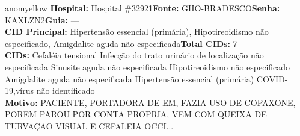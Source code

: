 \documentclass[a4paper,10pt]{article}
\begin{document}
\begin{anomalycard}[Interna\c{c}\~{a}o \#121087 | Pac. \#100353 | MODERADO (z=2.22) | LOS: 11d | 12/03/2026\,$\to$\,—]{anomyellow}
\textbf{Hospital:} Hospital \#32921\quad \textbf{Fonte:} GHO-BRADESCO\quad \textbf{Senha:} KAXLZN2\quad \textbf{Guia:} ---\\

\textbf{CID Principal:} {\small Hipertensão essencial (primária), Hipotireoidismo não especificado, Amigdalite aguda não especificada}\quad\textbf{Total CIDs:} 7\\

\textbf{CIDs:} {\scriptsize Cefaléia tensional \textbar{} Infecção do trato urinário de localização não especificada \textbar{} Sinusite aguda não especificada \textbar{} Hipotireoidismo não especificado \textbar{} Amigdalite aguda não especificada \textbar{} Hipertensão essencial (primária) \textbar{} COVID-19,vírus não identificado}\\

\textbf{Motivo:} {\scriptsize PACIENTE, PORTADORA DE EM, FAZIA USO DE COPAXONE, POREM PAROU POR CONTA PROPRIA, VEM COM QUEIXA DE TURVAÇAO VISUAL E CEFALEIA OCCI...}\\




\end{anomalycard}
\end{document}
